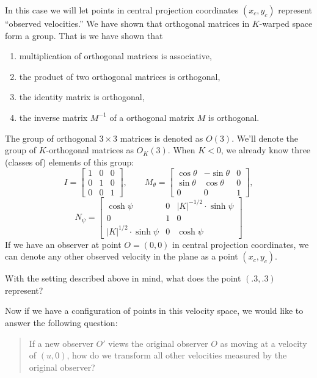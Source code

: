 \documentclass[12pt,noauthor,nooutcomes,handout,hints,newpage]{ximera}
\begin{document}
In this case we will let points in central projection coordinates
$(x_c,y_c)$ represent ``observed velocities.'' We have shown that
orthogonal matrices in $K$-warped space form a group. That is we have
shown that
\begin{enumerate}
\item multiplication of orthogonal matrices is associative, 
\item the product of two orthogonal matrices is orthogonal,
\item the identity matrix is orthogonal,
\item the inverse matrix $M^{-1}$ of a orthogonal matrix $M$ is orthogonal.
\end{enumerate}
The group of orthogonal $3\times 3$ matrices is denoted as
$O(3)$. We'll denote the group of $K$-orthogonal matrices as
$O_K(3)$. When $K<0$, we already know three (classes of) elements of this group:
\[
I =
\begin{bmatrix}
  1 & 0 & 0\\
  0 & 1 & 0\\
  0 & 0 & 1
\end{bmatrix},
\qquad
M_\theta=
\begin{bmatrix}
  \cos\theta & -\sin\theta & 0\\
  \sin\theta & \cos\theta & 0\\
  0 & 0 & 1
\end{bmatrix},
\]
\[
N_\psi=\begin{bmatrix}
\cosh\psi & 0 & |K|^{-1/2}\cdot\sinh\psi\\
0 & 1 & 0\\
|K|^{1/2}\cdot\sinh\psi & 0 & \cosh\psi
\end{bmatrix}
\]
If we have an observer at point $O = (0,0)$ in central projection
coordinates, we can denote any other observed velocity in the plane as
a point $(x_c,y_c)$.

\begin{problem}
  With the setting described above in mind, what does the point
  $(.3,.3)$ represent?
\end{problem}

Now if we have a configuration of points in this velocity space, we
would like to answer the following question:

\begin{quote}
  If a new observer $O'$ views the original observer $O$ as moving at
  a velocity of $(u,0)$, how do we transform all other velocities
  measured by the original observer?
\end{quote}
\end{document}
